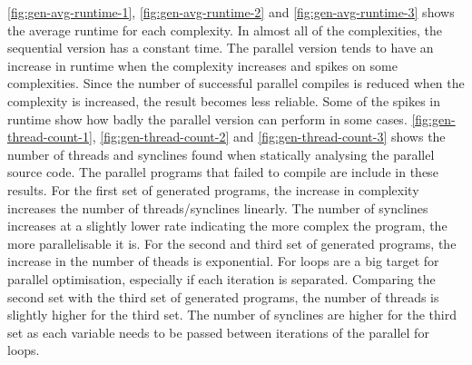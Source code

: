 \autoref{fig:gen-avg-runtime-1}, \autoref{fig:gen-avg-runtime-2} and \autoref{fig:gen-avg-runtime-3} shows the average runtime for each complexity. In almost all of the complexities, the sequential version has a constant time. The parallel version tends to have an increase in runtime when the complexity increases and spikes on some complexities. Since the number of successful parallel compiles is reduced when the complexity is increased, the result becomes less reliable. Some of the spikes in runtime show how badly the parallel version can perform in some cases.
\autoref{fig:gen-thread-count-1}, \autoref{fig:gen-thread-count-2} and \autoref{fig:gen-thread-count-3} shows the number of threads and synclines found when statically analysing the parallel source code. The parallel programs that failed to compile are include in these results. For the first set of generated programs, the increase in complexity increases the number of threads/synclines linearly. The number of synclines increases at a slightly lower rate indicating the more complex the program, the more parallelisable it is. For the second and third set of generated programs, the increase in the number of theads is exponential. For loops are a big target for parallel optimisation, especially if each iteration is separated. Comparing the second set with the third set of generated programs, the number of threads is slightly higher for the third set.
The number of synclines are higher for the third set as each variable needs to be passed between iterations of the parallel for loops.



